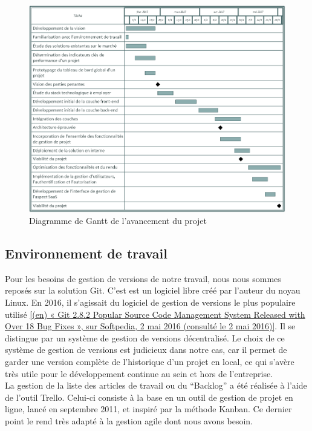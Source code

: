 \begin{spacing}{1.5}
\begin{figure}[h]
\centering
\includegraphics[width=1\linewidth]{gantt.png}
\caption{Diagramme de Gantt de l'avancement du projet}
\label{fig:gantt}
\end{figure}

\subsection{Environnement de travail}%
Pour les besoins de gestion de versions de notre travail, nous nous sommes reposés sur la solution Git. C'est est un logiciel libre créé par l'auteur du noyau Linux. En 2016, il s’agissait du logiciel de gestion de versions le plus populaire utilisé \ref{(en) « Git 2.8.2 Popular Source Code Management System Released with Over 18 Bug Fixes », sur Softpedia, 2 mai 2016 (consulté le 2 mai 2016)}. Il se distingue par un système de gestion de versions décentralisé. Le choix de ce système de gestion de versions est judicieux dans notre cas, car il permet de garder une version complète de l'historique d'un projet en local, ce qui s'avère très utile pour le développement continue au sein et hors de l'entreprise.\\

La gestion de la liste des articles de travail ou du “Backlog” a été réalisée à l'aide de l'outil Trello. Celui-ci consiste à la base en un outil de gestion de projet en ligne, lancé en septembre 2011, et inspiré par la méthode Kanban. Ce dernier point le rend très adapté à la gestion agile dont nous avons besoin.


\end{spacing}
